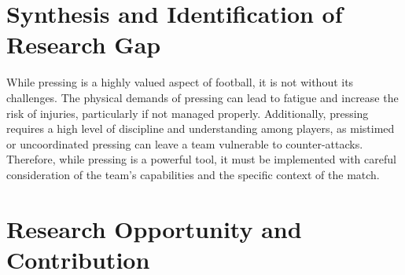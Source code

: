 \section{Synthesis and Identification of Research Gap}

While pressing is a highly valued aspect of football, it is not without its challenges. The physical demands of pressing can lead to fatigue and increase the risk of injuries, particularly if not managed properly. Additionally, pressing requires a high level of discipline and understanding among players, as mistimed or uncoordinated pressing can leave a team vulnerable to counter-attacks. Therefore, while pressing is a powerful tool, it must be implemented with careful consideration of the team's capabilities and the specific context of the match.



\section{Research Opportunity and Contribution}